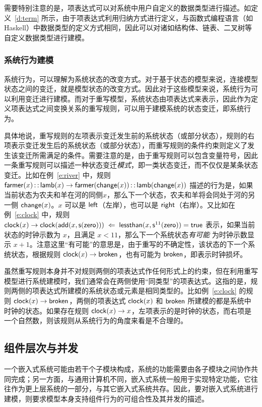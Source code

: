 需要特别注意的是，项表达式可以对系统中用户自定义的数据类型进行描述。如定义~\ref{d:term} 所示，由于项表达式利用归纳方式进行定义，与函数式编程语言（如 Haskell）中数据类型的定义方式相同，因此可以对诸如结构体、链表、二叉树等自定义数据类型进行建模。

\subsubsection{系统行为建模}
\label{sss:behavior-modeling}

系统行为，可以理解为系统状态的改变方式。对于基于状态的模型来说，连接模型状态之间的变迁，就是模型状态的改变方式。因此对于这些模型来说，系统行为可以利用变迁进行建模。而对于重写模型，系统状态由项表达式来表示，因此作为定义项表达式之间变换关系的重写规则，可以用于建模系统的状态变迁，即系统行为。

具体地说，重写规则的左项表示变迁发生前的系统状态（或部分状态），规则的右项表示变迁发生后的系统状态（或部分状态），而重写规则的条件约束则定义了发生该变迁所需满足的条件。需要注意的是，由于重写规则可以包含变量符号，因此一条重写规则可以描述一种状态变迁\emph{模式}，即一类状态变迁，而不仅仅是某条状态变迁。比如在例~\ref{e:river} 中，规则 $\operatorname{\mathsf{farmer}}(x)\operatorname{\mathsf{::}} \operatorname{\mathsf{lamb}}(x) \rightarrow \operatorname{\mathsf{farmer}}(\operatorname{\mathsf{change}}(x))\operatorname{\mathsf{::}}\operatorname{\mathsf{lamb}}(\operatorname{\mathsf{change}}(x))$ 描述的行为是，如果当前状态为农夫和羊在河的同侧$x$，那么下一个状态，农夫和羊将会同处于河的另一侧 $\operatorname{\mathsf{change}}(x)$。$x$ 可以是 $\operatorname{\mathsf{left}}$（左岸），也可以是 $\operatorname{\mathsf{right}}$（右岸）。又比如在例~\ref{e:clock} 中，规则 $\operatorname{\mathsf{clock}}(x) \rightarrow \operatorname{\mathsf{clock}}(\operatorname{\mathsf{add}}(x,\operatorname{\mathsf{s}}(\operatorname{\mathsf{zero}}))) \;\Leftarrow\; \operatorname{\mathsf{lessthan}}(x,\operatorname{\mathsf{s}}^{11}(\operatorname{\mathsf{zero}})) = \operatorname{\mathsf{true}}$ 表示，如果当前状态的时钟示数为 $x$，且满足 $x < 11$，那么下一个系统状态\emph{有可能} 为时钟示数显示 $x+1$。注意这里“有可能”的意思是，由于重写的不确定性，该状态的下一个系统状态，根据规则 $\operatorname{\mathsf{clock}}(x) \rightarrow \operatorname{\mathsf{broken}}$，也有可能为 $\operatorname{\mathsf{broken}}$，即表示时钟损坏。

虽然重写规则本身并不对规则两侧的项表达式作任何形式上的约束，但在利用重写模型进行系统建模时，我们通常会在两侧使用“同类型”的项表达式。这指的是，规则两侧的项表达式所建模的系统状态或元素是相同类型的。比如例~\ref{e:clock} 的规则 $\operatorname{\mathsf{clock}}(x) \rightarrow \operatorname{\mathsf{broken}}$，两侧的项表达式 $\operatorname{\mathsf{clock}}(x)$ 和 $\operatorname{\mathsf{broken}}$ 所建模的都是系统中时钟的状态。如果存在规则 $\operatorname{\mathsf{clock}}(x) \rightarrow x$，左项表示的是时钟的状态，而右项是一个自然数，则该规则从系统行为的角度来看是不合理的。

\subsection{组件层次与并发}
\label{ss:multi-component}

一个嵌入式系统可能由若干个子模块构成，系统的功能需要由各子模块之间协作共同完成；另一方面，与通用计算机不同，嵌入式系统一般用于实现特定功能，它往往作为更上层系统的一部分，与其它嵌入式系统共存。因此，要对嵌入式系统进行建模，则要求模型本身支持组件行为的可组合性及其并发的描述。

